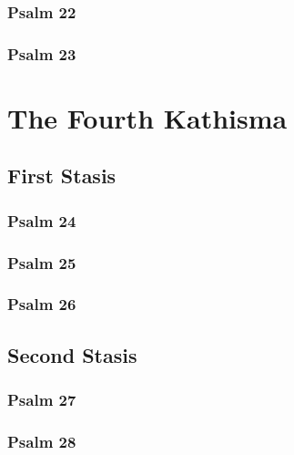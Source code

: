 \documentclass[12pt]{book}
\newcommand{\kathismabreak}{
  \medskip
  \begin{center}
  \begin{footnotesize}
  

  

  

  
  \end{footnotesize}
  \end{center}
  \smallbreak
}
\begin{document}
\subsubsection{Psalm 22}


\subsubsection{Psalm 23}


\kathismabreak

\section{The Fourth Kathisma}

\subsection{First Stasis}

\subsubsection{Psalm 24}


\subsubsection{Psalm 25}


\pagebreak %
\subsubsection{Psalm 26}


\pagebreak %
\kathismabreak

\subsection{Second Stasis}

\subsubsection{Psalm 27}


\subsubsection{Psalm 28}

\end{document}

